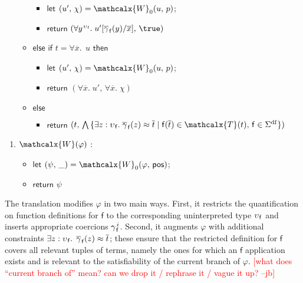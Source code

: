 \documentclass[runningheads,a4paper]{llncs}
\newcommand{\con}[1]{\mathsf{#1}}
\renewcommand\vec[1]{\overline{#1}}
\let\oldSigma=\Sigma
\def\Sigma{\mathrm{\oldSigma}}
\newcommand{\teq}{\approx}
\newcommand{\terms}{\mathcalx{T}}
\newcommand{\conv}{\mathcalx{W}}
\newcommand{\sfundefs}[1]{#1^\mathrm{df}}
\newcommand{\ptrue}{\con{pos}}
\newcommand\concret{\gamma} %
\newcommand{\vecfarg}[1]{\vec{\concret}_{\vthinspace#1}}
\newcommand{\fargx}[2]{\concret^{\vthinspace#2}_{\vthinspace#1}}
\newcommand{\fargsort}[1]{\upsilon_{\vthinspace#1}}
\newcommand{\rem}[1]{\textcolor{red}{[#1]}}
\newcommand{\jb}[1]{\rem{#1 --jb}}
\newcommand{\vthinspace}{\kern+0.083333em}
\newcommand{\typ}[1]{^{\vthinspace #1}}
\begin{document}
\begin{enumerate}
\begin{itemize}
    \begin{itemize}
      \item[] $\mathsf{let}$ $( u',\, \chi ) = \conv_0( u,\, p )$;
      \item[] $\mathsf{return}$ $( \forall y\typ{\fargsort{\con{f}}}.\; u' [ \vecfarg{\con{f}}( y ) / \vec x ],\, \true )$
    \end{itemize}
  \item[] $\mathsf{else}$ $\mathsf{if}$ $t = \forall \vec x.\;\, u$ $\mathsf{then}$
    \begin{itemize}
      \item[] $\mathsf{let}$ $( u',\, \chi ) = \conv_0( u,\, p )$;
      \item[] $\mathsf{return}$ $( \forall \vec x.\; u',\, \forall \vec x.\; \chi )$
    \end{itemize}
   \item[] $\mathsf{else}$
   \begin{itemize}
     \item[] $\mathsf{return}$ $( t,\, \bigwedge\, \{ \exists z : \fargsort{\con{f}}.\; \vecfarg{\con{f}}( z ) \teq \vec t \mid \con{f}( \vec t ) \in \terms( t ),\, \con{f} \in \sfundefs{\Sigma} \} )$
   \end{itemize}
 \end{itemize}
\end{enumerate}
\begin{enumerate}
\item[\ ] 
$\conv( \varphi )$ : 
 \begin{itemize}
   \item[] $\mathsf{let}$ $( \psi,\, \_ ) = \conv_0( \varphi,\, \ptrue )$;
   \item[] $\mathsf{return}$ $\psi$
  \end{itemize}
\end{enumerate}


The translation modifies $\varphi$ in two main ways. First, it restricts the
quantification on function definitions for $\con{f}$ to the corresponding
uninterpreted type $\fargsort{\con{f}}$ and inserts appropriate coercions
$\fargx{\con{f}}{i}$. Second, it augments $\varphi$ with additional constraints
$\exists z : \fargsort{\con{f}}.\;\, \vecfarg{\con{f}}( z ) \teq \vec t$; these
ensure that the restricted definition for $\con{f}$ covers all relevant tuples
of terms, namely the ones for which an $\con{f}$ application exists and is
relevant to the satisfiability of the current branch of $\varphi$.
\jb{what does ``current branch of'' mean? can we drop it / rephrase it / vague
it up?}
\end{document}
